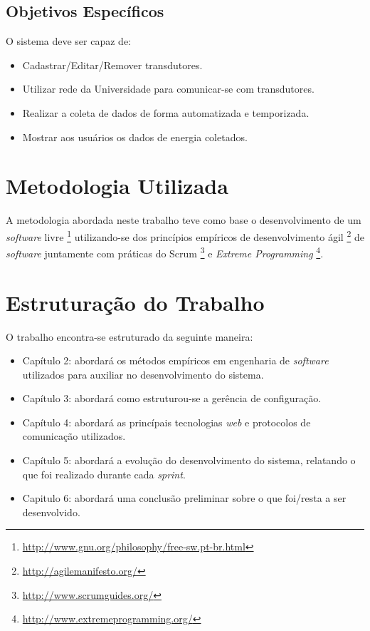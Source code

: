 \subsection{Objetivos Específicos}
O sistema deve ser capaz de:
\begin{itemize}
    \item Cadastrar/Editar/Remover transdutores.
    \item Utilizar rede da Universidade para comunicar-se com transdutores.
    \item Realizar a coleta de dados de forma automatizada e temporizada.
    \item Mostrar aos usuários os dados de energia coletados.
\end{itemize}

\section{Metodologia Utilizada}
A metodologia abordada neste trabalho teve como base o desenvolvimento de um \textit{software} livre \footnote{\url{http://www.gnu.org/philosophy/free-sw.pt-br.html}} utilizando-se dos princípios empíricos de desenvolvimento ágil \footnote{\url{http://agilemanifesto.org/}} de \textit{software} juntamente com práticas do Scrum \footnote{\url{http://www.scrumguides.org/}} e \textit{Extreme Programming} \footnote{\url{http://www.extremeprogramming.org/}}.

\section{Estruturação do Trabalho}
O trabalho encontra-se estruturado da seguinte maneira:

\begin{itemize}
    \item Capítulo 2: abordará os métodos empíricos em engenharia de \textit{software} utilizados para
    auxiliar no desenvolvimento do sistema.
    \item Capítulo 3: abordará como estruturou-se a gerência de configuração.
    \item Capítulo 4: abordará as princípais tecnologias \textit{web} e protocolos de comunicação utilizados.
    \item Capítulo 5: abordará a evolução do desenvolvimento do sistema, relatando o que foi realizado durante cada \textit{sprint}.
    \item Capitulo 6: abordará uma conclusão preliminar sobre o que foi/resta a ser desenvolvido.
\end{itemize}